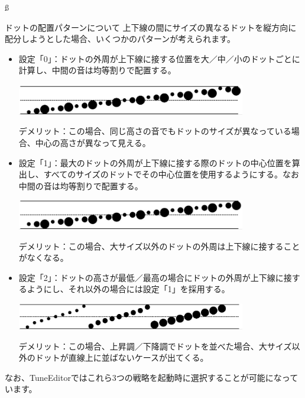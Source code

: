 ß
\begin{itembox}[l]{\textsf{ドットの配置パターンについて}}\label{dotdistribution}
上下線の間にサイズの異なるドットを縦方向に配分しようとした場合、いくつかのパターンが考えられます。

\medskip
\begin{itemize}
\item \textsf{設定「0」：}ドットの外周が上下線に接する位置を大／中／小のドットごとに計算し、中間の音は均等割りで配置する。
\medskip
\begin{center}
	\includegraphics[width=10cm]{dd0.png}
 \end{center}
\medskip
\textsf{デメリット：}この場合、同じ高さの音でもドットのサイズが異なっている場合、中心の高さが異なって見える。
\medskip
\item \textsf{設定「1」：}最大のドットの外周が上下線に接する際のドットの中心位置を算出し、すべてのサイズのドットでその中心位置を使用するようにする。なお中間の音は均等割りで配置する。
\medskip
\begin{center}
	\includegraphics[width=10cm]{dd1.png}
 \end{center}
\medskip
\textsf{デメリット：}この場合、大サイズ以外のドットの外周は上下線に接することがなくなる。
\medskip
\item \textsf{設定「2」：}ドットの高さが最低／最高の場合にドットの外周が上下線に接するようにし、それ以外の場合には設定「1」を採用する。
\medskip
\begin{center}
	\includegraphics[width=10cm]{dd2.png}
 \end{center}
\medskip
\textsf{デメリット：}この場合、上昇調／下降調でドットを並べた場合、大サイズ以外のドットが直線上に並ばないケースが出てくる。
\end{itemize}

\medskip
なお、TuneEditorではこれら3つの戦略を起動時に選択することが可能になっています。

\end{itembox}


